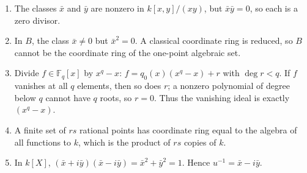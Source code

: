 \begin{enumerate}[label=\textbf{E\arabic*.},leftmargin=*]
\item The classes \(\bar x\) and \(\bar y\) are nonzero in \(k[x,y]/(xy)\), but \(\bar x\bar y=0\), so each is a zero divisor.
\item In \(B\), the class \(\bar x\neq0\) but \(\bar x^2=0\).  A classical coordinate ring is reduced, so \(B\) cannot be the coordinate ring of the one-point algebraic set.
\item Divide \(f\in\mathbb F_q[x]\) by \(x^q-x\): \(f=q_0(x)(x^q-x)+r\) with \(\deg r<q\).  If \(f\) vanishes at all \(q\) elements, then so does \(r\); a nonzero polynomial of degree below \(q\) cannot have \(q\) roots, so \(r=0\).  Thus the vanishing ideal is exactly \((x^q-x)\).
\item A finite set of \(rs\) rational points has coordinate ring equal to the algebra of all functions to \(k\), which is the product of \(rs\) copies of \(k\).
\item In \(k[X]\), \((\bar x+i\bar y)(\bar x-i\bar y)=\bar x^2+\bar y^2=1\).  Hence \(u^{-1}=\bar x-i\bar y\).
\end{enumerate}
